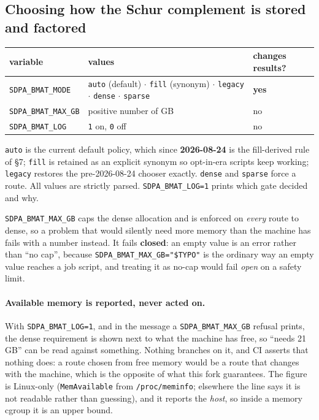 \documentclass[11pt]{article}
\newcommand{\code}[1]{\texttt{#1}}
\begin{document}
\subsection{Choosing how the Schur complement is stored and factored}

\begin{center}\small
\begin{tabular}{@{}p{5.1cm}p{5.6cm}l@{}}
\toprule
variable & values & changes results? \\
\midrule
\code{SDPA\_BMAT\_MODE} & \code{auto} (default) $\cdot$ \code{fill} (synonym) $\cdot$
  \code{legacy} $\cdot$ \code{dense} $\cdot$ \code{sparse} & \textbf{yes} \\
\code{SDPA\_BMAT\_MAX\_GB} & positive number of GB & no \\
\code{SDPA\_BMAT\_LOG} & \code{1} on, \code{0} off & no \\
\bottomrule
\end{tabular}
\end{center}

\code{auto} is the current default policy, which since \textbf{2026-08-24} is the fill-derived rule
of \S7; \code{fill} is retained as an explicit synonym so opt-in-era scripts keep working;
\code{legacy} restores the pre-2026-08-24 chooser exactly. \code{dense} and \code{sparse} force a
route. All values are strictly parsed. \code{SDPA\_BMAT\_LOG=1} prints which gate decided and why.

\code{SDPA\_BMAT\_MAX\_GB} caps the dense allocation and is enforced on \emph{every} route to
dense, so a problem that would silently need more memory than the machine has fails with a number
instead. It fails \textbf{closed}: an empty value is an error rather than ``no cap'', because
\code{SDPA\_BMAT\_MAX\_GB="\$TYPO"} is the ordinary way an empty value reaches a job script, and
treating it as no-cap would fail \emph{open} on a safety limit.

\paragraph{Available memory is reported, never acted on.} With \code{SDPA\_BMAT\_LOG=1}, and in the
message a \code{SDPA\_BMAT\_MAX\_GB} refusal prints, the dense requirement is shown next to what the
machine has free, so ``needs 21 GB'' can be read against something. Nothing branches on it, and CI
asserts that nothing does: a route chosen from free memory would be a route that changes with the
machine, which is the opposite of what this fork guarantees. The figure is Linux-only
(\code{MemAvailable} from \code{/proc/meminfo}; elsewhere the line says it is not readable rather
than guessing), and it reports the \emph{host}, so inside a memory cgroup it is an upper bound.
\end{document}
